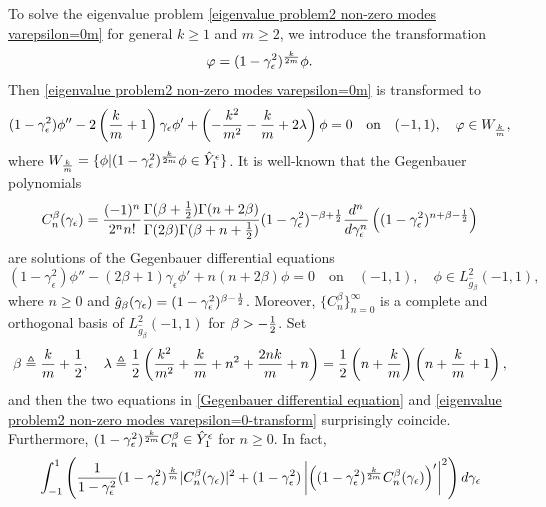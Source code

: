 \documentclass[1 [leqno, 11pt]{amsart}
\numberwithin{equation}{section}
\let\ep=\epsilon
\begin{document}
\begin{CJK*}{GBK}{song}
To
 solve the eigenvalue problem \eqref{eigenvalue problem2 non-zero modes varepsilon=0m} for general $k\geq1$ and $m\geq2$,
we introduce the transformation
\begin{align}\label{transformation-multi-periodic perturbations}
\varphi=(1-\gamma_\ep^2)^{k\over2m}\phi.
\end{align}
Then \eqref{eigenvalue problem2 non-zero modes varepsilon=0m} is transformed to
\begin{equation}\label{eigenvalue problem2 non-zero modes varepsilon=0-transform}
(1-\gamma_\ep^2)\phi''-2\left({k\over m}+1\right)\gamma_\ep\phi'+\left(-{k^2\over m^2}-{k\over m}+2\lambda\right)\phi =0 \quad \text{on}\quad (-1,1),\quad\varphi\in W_{k\over m},
\end{equation}
where $W_{k\over m}=\{\phi|(1-\gamma_\ep^2)^{k\over2m}\phi\in\hat Y_1^\ep\}$. It is  well-known \cite{Suetin2001} that the
Gegenbauer polynomials
\begin{align}\label{Gegenbauer polynomials}
C_n^\beta(\gamma_\ep)={(-1)^n\over 2^n n!}{\Gamma(\beta+{1\over2})\Gamma(n+2\beta)\over\Gamma(2\beta)\Gamma(\beta+n+{1\over2})}(1-\gamma_\ep^2)^{-\beta+{1\over2}}{d^n\over d\gamma_\ep^n}\left((1-\gamma_\ep^2)^{n+\beta-{1\over2}}\right)
\end{align}
are solutions of
 the   Gegenbauer
 differential equations
\begin{equation}\label{Gegenbauer differential equation}
(1-\gamma_\ep^2)\phi''-(2\beta+1)\gamma_\ep\phi'+n\left(n+2\beta\right)\phi =0 \quad \text{on}\quad (-1,1),\quad\phi\in L_{\hat g_\beta}^2(-1,1),
\end{equation}
where $n\geq0$ and $\hat g_\beta(\gamma_\ep)=(1-\gamma_\ep^2)^{\beta-{1\over2}}$. Moreover, $\{C_n^\beta\}_{n=0}^\infty$ is a complete and  orthogonal basis of $ L_{\hat g_\beta}^2(-1,1)$ for $\beta>-{1\over2}$. Set
\begin{align*}
\beta\triangleq{k\over m}+{1\over2},\quad \lambda\triangleq{1\over2}\left({k^2\over m^2}+{k\over m}+n^2+{2nk\over m}+n\right)={1\over2}\left(n+{k\over m}\right)\left(n+{k\over m} +1\right),
\end{align*}
and then the two equations
in \eqref{Gegenbauer differential equation} and \eqref{eigenvalue problem2 non-zero modes varepsilon=0-transform} surprisingly coincide.
Furthermore, $(1-\gamma_\ep^2)^{k\over2m}C_n^\beta\in\hat Y_1^\ep$ for $n\geq0$.
In fact,
\begin{align}\nonumber
&\int_{-1}^1\left({1\over1-\gamma_\ep^2}(1-\gamma_\ep^2)^{k\over m}|C_n^\beta(\gamma_\ep)|^2+(1-\gamma_\ep^2)\left|\left((1-\gamma_\ep^2)^{k\over 2m}C_n^\beta(\gamma_\ep)\right)'\right|^2\right)d\gamma_\ep\\\nonumber

\end{align}
\end{CJK*}
\end{document}
